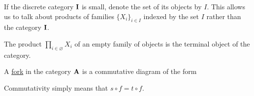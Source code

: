 \begin{note}\label{note:small_categorical_product}
  If the discrete category $\operatorname{\mathbf{I}}$ is small, denote the set of its objects by $I$. This allows us to talk about products of families $\{ X_i \}_{i \in I}$ indexed by the set $I$ rather than the category $\operatorname{\mathbf{I}}$.
\end{note}

\begin{note}\label{note:empty_categorical_product}
  The product $\prod_{i \in \varnothing} X_i$ of an empty family of objects is the terminal object of the category.
\end{note}

\begin{definition}\label{def:categorical_fork}\cite[112]{Leinster2014}
  A \ul{fork} in the category $\operatorname{\mathbf{A}}$ is a commutative diagram of the form
  \begin{Center}
  \end{Center}

  Commutativity simply means that $s \circ f = t \circ f$.
\end{definition}

